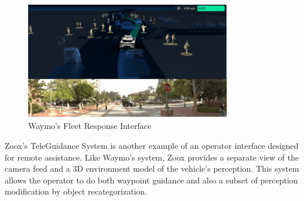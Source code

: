 \begin{figure}
    \includegraphics[width=0.8\textwidth]{figures/waymo.png}
    \centering
    \caption{Waymo's Fleet Response Interface \cite{waymo2024fleetresponse}}
    \label{fig:Waymo}
\end{figure}

Zoox's TeleGuidance System \cite{zoox2024teleguidance} is another example of an operator interface designed for remote assistance. Like Waymo’s system, Zoox provides a separate view of the camera feed and a 3D environment model of the vehicle’s perception. This system allows the operator to do both waypoint guidance
 \cite{corridor} and also a subset of perception modification \cite{feiler2023perception} by object recategorization.

